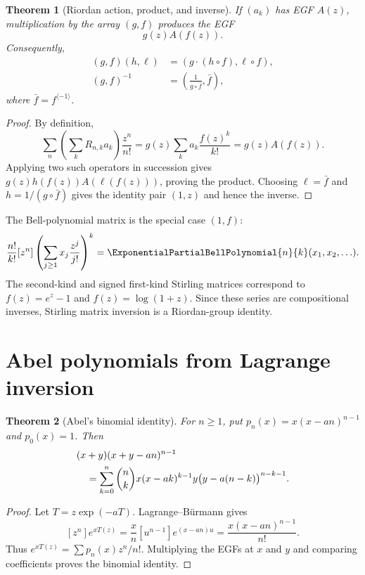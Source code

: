 \documentclass[11pt,a4paper,oneside,openany]{book}
\newtheorem{theorem}{Theorem}[chapter]
\theoremstyle{definition}
\theoremstyle{remark}
\begin{document}
\begin{theorem}[Riordan action, product, and inverse]
\label{unif:thm-riordan-group}
If $(a_k)$ has EGF $A(z)$, multiplication by the array $(g,f)$ produces the
EGF
\begin{equation}\label{unif:eq-riordan-action}
 g(z)A(f(z)).
\end{equation}
Consequently,
\begin{align}
 (g,f)(h,\ell)&=(g\cdot(h\circ f),\ell\circ f),
 \label{unif:eq-riordan-product}\\
 (g,f)^{-1}&=\left(\frac1{g\circ\bar f},\bar f\right),
 \label{unif:eq-riordan-inverse}
\end{align}
where $\bar f=f^{\langle-1\rangle}$.
\end{theorem}
\begin{proof}
By definition,
\[
 \sum_n\left(\sum_kR_{n,k}a_k\right)\frac{z^n}{n!}
 =g(z)\sum_k a_k\frac{f(z)^k}{k!}=g(z)A(f(z)).
\]
Applying two such operators in succession gives
$g(z)h(f(z))A(\ell(f(z)))$, proving the product. Choosing
$\ell=\bar f$ and $h=1/(g\circ\bar f)$ gives the identity pair $(1,z)$ and
hence the inverse.
\end{proof}

The Bell-polynomial matrix is the special case $(1,f)$:
\begin{equation}\label{unif:eq-bell-riordan}
 \frac{n!}{k!}[z^n]
 \left(\sum_{j\ge1}x_j\frac{z^j}{j!}\right)^k
 =\ExponentialPartialBellPolynomial{n}{k}(x_1,x_2,\ldots).
\end{equation}
The second-kind and signed first-kind Stirling matrices correspond to
$f(z)=e^z-1$ and $f(z)=\log(1+z)$. Since these series are compositional
inverses, Stirling matrix inversion is a Riordan-group identity.

\section{Abel polynomials from Lagrange inversion}

\begin{theorem}[Abel's binomial identity]
For $n\ge1$, put $p_n(x)=x(x-an)^{n-1}$ and $p_0(x)=1$. Then
\begin{align}
 &(x+y)(x+y-an)^{n-1}
 \notag\\
 &\quad=\sum_{k=0}^{n}\binom nk
 x(x-ak)^{k-1}y\bigl(y-a(n-k)\bigr)^{n-k-1}.
 \label{unif:eq-abel-binomial}
\end{align}
\end{theorem}
\begin{proof}
Let $T=z\exp(-aT)$. Lagrange--B\"urmann gives
\[
 [z^n]e^{xT(z)}=\frac{x}{n}[u^{n-1}]e^{(x-an)u}
 =\frac{x(x-an)^{n-1}}{n!}.
\]
Thus $e^{xT(z)}=\sum p_n(x)z^n/n!$. Multiplying the EGFs at $x$ and $y$ and
comparing coefficients proves the binomial identity.
\end{proof}
\end{document}
